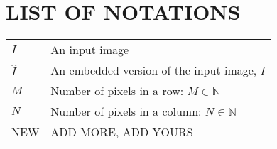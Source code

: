 \chapter{LIST OF NOTATIONS}
\noindent
\begin{longtable}[l]{p{60pt}p{300pt}}

$I$ 	  &	 	An input image \\
$\hat{I}$ 	&	 	An embedded version of the input image, $I$ \\ 
$M$ 	  &	 	Number of pixels in a row: $M \in \mathbb{N}$\\
$N$ 	 	&	 	Number of pixels in a column: $N \in \mathbb{N}$ \\
NEW & ADD MORE, ADD YOURS\\
\end{longtable}

